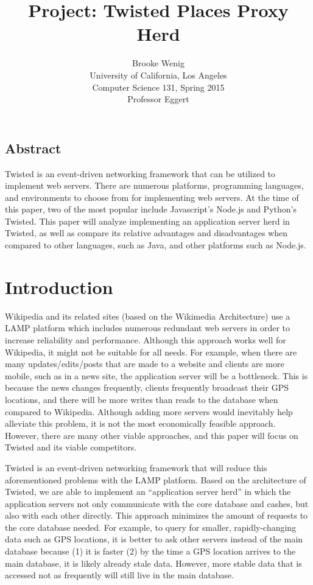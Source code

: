 \documentclass[letterpaper,twocolumn,10pt]{article}
\begin{document}
\date{}
\title{\Large \bf Project: Twisted Places Proxy Herd}
\author{
{\rm Brooke Wenig}\\
University of California, Los Angeles\\
Computer Science 131, Spring 2015\\
Professor Eggert  }
\maketitle
\thispagestyle{empty}
\subsection*{Abstract}
Twisted is an event-driven networking framework that can be utilized to implement web servers. There are numerous platforms, programming languages, and environments to choose from for implementing web servers. At the time of this paper, two of the most popular include Javascript’s Node.js and Python’s Twisted. This paper will analyze implementing an application server herd in Twisted, as well as compare its relative advantages and disadvantages when compared to other languages, such as Java, and other platforms such as Node.js.

\section{Introduction}
Wikipedia and its related sites (based on the Wikimedia Architecture) use a LAMP platform which includes numerous redundant web servers in order to increase reliability and performance. Although this approach works well for Wikipedia, it might not be suitable for all needs. For example, when there are many updates/edits/posts that are made to a website and clients are more mobile, such as in a news site, the application server will be a bottleneck. This is because the news changes frequently, clients frequently broadcast their GPS locations, and there will be more writes than reads to the database when compared to Wikipedia. Although adding more servers would inevitably help alleviate this problem, it is not the most economically feasible approach. However, there are many other viable approaches, and this paper will focus on Twisted and its viable competitors. 

Twisted is an event-driven networking framework that will reduce this aforementioned problems with the LAMP platform. Based on the architecture of Twisted, we are able to implement an “application server herd” in which the application servers not only communicate with the core database and cashes, but also with each other directly. This approach minimizes the amount of requests to the core database needed. For example, to query for smaller, rapidly-changing data such as GPS locations, it is better to ask other servers instead of the main database because (1) it is faster (2) by the time a GPS location arrives to the main database, it is likely already stale data. However, more stable data that is accessed not as frequently will still live in the main database. 
\end{document}

